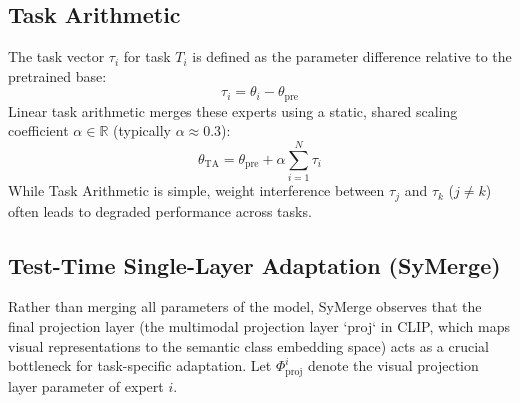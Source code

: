 \documentclass{article}
\theoremstyle{plain}
\theoremstyle{definition}
\theoremstyle{remark}
\begin{document}
\subsection{Task Arithmetic}
The task vector $\tau_i$ for task $T_i$ is defined as the parameter difference relative to the pretrained base:
\begin{equation}
    \tau_i = \theta_i - \theta_{\text{pre}}
\end{equation}
Linear task arithmetic merges these experts using a static, shared scaling coefficient $\alpha \in \mathbb{R}$ (typically $\alpha \approx 0.3$):
\begin{equation}
    \theta_{\text{TA}} = \theta_{\text{pre}} + \alpha \sum_{i=1}^N \tau_i
\end{equation}
While Task Arithmetic is simple, weight interference between $\tau_j$ and $\tau_k$ ($j \neq k$) often leads to degraded performance across tasks.

\subsection{Test-Time Single-Layer Adaptation (SyMerge)}
Rather than merging all parameters of the model, SyMerge \cite{symerge} observes that the final projection layer (the multimodal projection layer `proj` in CLIP, which maps visual representations to the semantic class embedding space) acts as a crucial bottleneck for task-specific adaptation. Let $\Phi_{\text{proj}}^i$ denote the visual projection layer parameter of expert $i$. 
\end{document}
